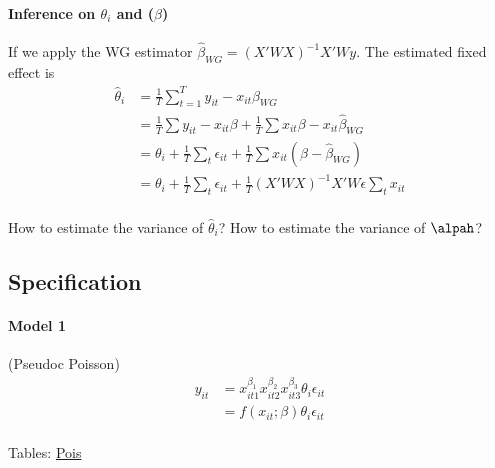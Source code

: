 \paragraph{Inference on $\theta_i$ and ($\beta$)}
If we apply the WG estimator $\hat{\beta}_{WG}= (X'WX)^{-1}X'W y$. The
estimated fixed effect is \begin{equation*}
    \begin{split}
        \hat{\theta}_i &= \frac{1}{T}\sum_{t=1}^T y_{it}-x_{it}\hat{\beta}_{WG}\\
        &= \frac{1}{T}\sum y_{it}-x_{it}\beta+\frac{1}{T}\sum x_{it}\beta-x_{it}\hat{\beta}_{WG}\\
        &= \theta_i+\frac{1}{T}\sum_t \epsilon_{it} + \frac{1}{T}\sum x_{it}(\beta-\hat{\beta}_{WG})\\
        & = \theta_i + \frac{1}{T}\sum_t \epsilon_{it} + \frac{1}{T}(X'WX)^{-1}X'W\epsilon \sum_t x_{it}\\
    \end{split}

\end{equation*}
\begin{question}
    How to estimate the variance of $\hat{\theta}_i$? How to estimate the variance of $\alpah$?
\end{question}

\subsection{Specification}\hypertarget{home}{}
\paragraph{Model 1} (Pseudoc Poisson)
\begin{equation*}
    \begin{split}
        y_{it}&=x_{it1}^{\beta_1}x_{it2}^{\beta_2}x_{it3}^{\beta_3}\theta_i\epsilon_{it}\\
        &= f(x_{it};\beta)\theta_i\epsilon_{it}\\
    \end{split}
\end{equation*}

Tables: \hyperlink{reg_inf_pois_2022}{Pois}

